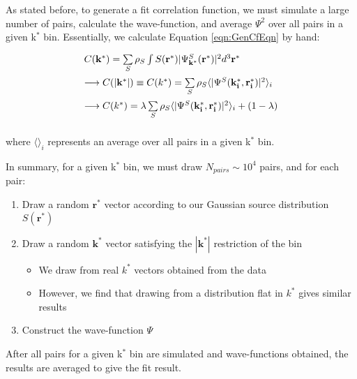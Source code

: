 \documentclass[../AnalysisNoteJBuxton.tex]{subfiles}
\begin{document}
As stated before, to generate a fit correlation function, we must simulate a large number of pairs, calculate the wave-function, and average $\Psi^{2}$ over all pairs in a given k$^{*}$ bin.  Essentially, we calculate Equation \ref{eqn:GenCfEqn} by hand:

\begin{equation}
\begin{array}{l}
\vspace{2mm}
  C(\mathbf{k^{*}}) = \sum\limits_{S}\rho_{S}\int S(\mathbf{r^{*}})|\Psi^{S}_{\mathbf{k^{*}}}(\mathbf{r^{*}})|^{2}d^{3}\mathbf{r^{*}} \\
\vspace{2mm}
  \longrightarrow C(|\mathbf{k^{*}}|) \equiv C(k^{*}) = \sum\limits_{S}\rho_{S}\langle |\Psi^{S}(\mathbf{k^{*}_{i}},\mathbf{r^{*}_{i}})|^{2} \rangle_{i} \\
\vspace{2mm}
  \longrightarrow C(k^{*}) = \lambda\sum\limits_{S}\rho_{S}\langle |\Psi^{S}(\mathbf{k^{*}_{i}},\mathbf{r^{*}_{i}})|^{2} \rangle_{i} + (1-\lambda)

\end{array}
\label{eqn:CoulombEqn2}
\end{equation}

where $\langle \rangle_{i}$ represents an average over all pairs in a given k$^{*}$ bin.

In summary, for a given k$^{*}$ bin, we must draw $N_{pairs} \sim 10^{4}$ pairs, and for each pair:

\begin{enumerate}
 \item Draw a random $\mathbf{r}^{*}$ vector according to our Gaussian source distribution $S(\mathbf{r}^{*})$
 \item Draw a random $\mathbf{k}^{*}$ vector satisfying the $|\mathbf{k}^{*}|$ restriction of the bin
 \begin{itemize}
  \item We draw from real $k^{*}$ vectors obtained from the data
  \item However, we find that drawing from a distribution flat in $k^{*}$ gives similar results
 \end{itemize}
 \item Construct the wave-function $\Psi$
\end{enumerate}

After all pairs for a given k$^{*}$ bin are simulated and wave-functions obtained, the results are averaged to give the fit result.
\end{document}
